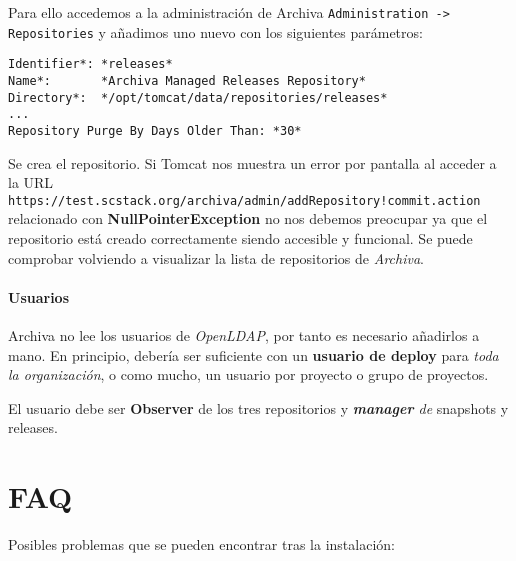 \par Para ello accedemos a la administración de Archiva \texttt{Administration -\textgreater{} Repositories} y añadimos uno nuevo con los siguientes parámetros:

\lstset{style=rubybasico}
\begin{lstlisting}[frame=trbl]
Identifier*: *releases*
Name*:       *Archiva Managed Releases Repository*
Directory*:  */opt/tomcat/data/repositories/releases*
...
Repository Purge By Days Older Than: *30*
\end{lstlisting}

\par Se crea el repositorio. Si Tomcat nos muestra un error por pantalla al acceder a la URL \texttt{https://test.scstack.org/archiva/admin/addRepository!commit.action} relacionado con \textbf{NullPointerException} no nos debemos preocupar ya que el repositorio está creado correctamente siendo accesible y funcional. Se puede comprobar volviendo a visualizar la lista de repositorios de \emph{Archiva}.

\paragraph{Usuarios}

\par Archiva no lee los usuarios de \emph{OpenLDAP}, por tanto es necesario añadirlos a mano. En principio, debería ser suficiente con un \textbf{usuario de deploy} para \emph{toda la organización}, o como mucho, un usuario por proyecto o grupo de proyectos.

\par El usuario debe ser \textbf{Observer} de los tres repositorios y \emph{\textbf{manager} de} snapshots y releases.

\section{FAQ}
\label{sec:faq}

\par Posibles problemas que se pueden encontrar tras la instalación:


